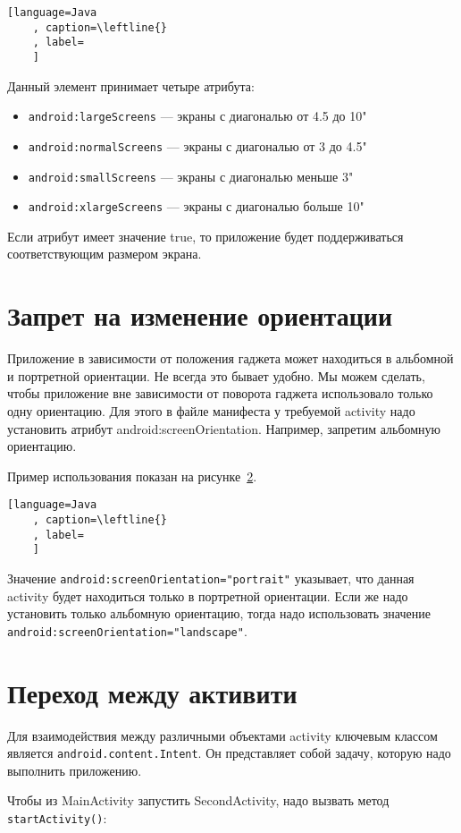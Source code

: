 \begin{lstlisting}[language=Java
	, caption=\leftline{}
	, label=
	]
\end{lstlisting}

Данный элемент принимает четыре атрибута:

\begin{itemize}
	\item \texttt{android:largeScreens} --- экраны с диагональю от 4.5 до 10"
	\item \texttt{android:normalScreens} --- экраны с диагональю от 3 до 4.5"
	\item \texttt{android:smallScreens} --- экраны с диагональю меньше 3"
	\item \texttt{android:xlargeScreens} --- экраны с диагональю больше 10"
\end{itemize}

Если атрибут имеет значение true, то приложение будет поддерживаться
соответствующим размером экрана.

\section{Запрет на изменение ориентации}
Приложение в зависимости от положения гаджета может находиться в
альбомной и портретной ориентации. Не всегда это бывает удобно. Мы
можем сделать, чтобы приложение вне зависимости от поворота гаджета
использовало только одну ориентацию. Для этого в файле манифеста у
требуемой activity надо установить атрибут android:screenOrientation.
Например, запретим альбомную ориентацию.\par
Пример использования показан на рисунке~\ref{}.

\begin{lstlisting}[language=Java
	, caption=\leftline{}
	, label=
	]
\end{lstlisting}

Значение \texttt{android:screenOrientation="portrait"} указывает,
что данная activity будет находиться только в портретной ориентации.
Если же надо установить только альбомную ориентацию, тогда надо использовать
значение \texttt{android:screenOrientation="landscape"}.

\section{Переход между активити}
Для взаимодействия между различными объектами activity ключевым
классом является \texttt{android.content.Intent}. Он представляет собой
задачу, которую надо выполнить приложению.\par
Чтобы из MainActivity запустить SecondActivity, надо вызвать метод
\texttt{startActivity()}:

